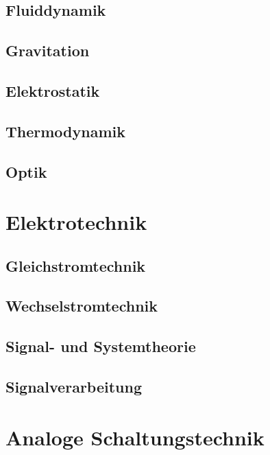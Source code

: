 \documentclass[a5paper]{report}
\begin{document}
		\chapter{Fluiddynamik}
		

		\chapter{Gravitation}
		

		\chapter{Elektrostatik}
		

		\chapter{Thermodynamik}
		

		\chapter{Optik}
		

	\part{Elektrotechnik}

		\chapter{Gleichstromtechnik}
		

		\chapter{Wechselstromtechnik}
		

		\chapter{Signal- und Systemtheorie}
		
		\chapter{Signalverarbeitung}
		
		
	\part{Analoge Schaltungstechnik}
	
\end{document}
